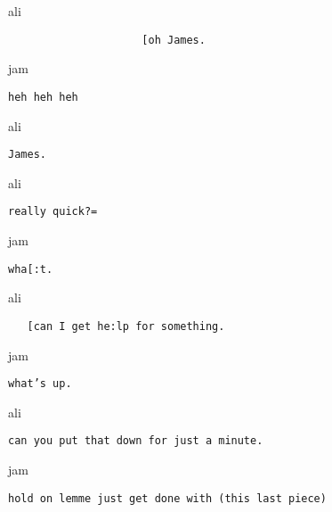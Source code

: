 \documentclass[output=paper,nonflat,modfont,draft]{langsci/langscibook}
\begin{document}
\begin{transbox}{2}{ali}
\begin{verbatim}
                     [oh James.
\end{verbatim}
\end{transbox}

\begin{transbox}{3}{jam}
\begin{verbatim}
heh heh heh
\end{verbatim}
\end{transbox}

\begin{transbox}{4}{ali}
\begin{verbatim}
James.
\end{verbatim}
\end{transbox}


\begin{transbox}{6}{ali}
\begin{verbatim}
really quick?=
\end{verbatim}
\end{transbox}

\begin{transbox}{7}{jam}
\begin{verbatim}
wha[:t.
\end{verbatim}
\end{transbox}

\begin{transbox}{8}{ali}
\begin{verbatim}
   [can I get he:lp for something.
\end{verbatim}
\end{transbox}

\begin{transbox}{9}{jam}
\begin{verbatim}
what’s up.
\end{verbatim}
\end{transbox}

\begin{transbox}{10}{ali}
\begin{verbatim}
can you put that down for just a minute.
\end{verbatim}
\end{transbox}

\begin{transbox}{11}{jam}
\begin{verbatim}
hold on lemme just get done with (this last piece)
\end{verbatim}
\end{transbox}
\end{document}

